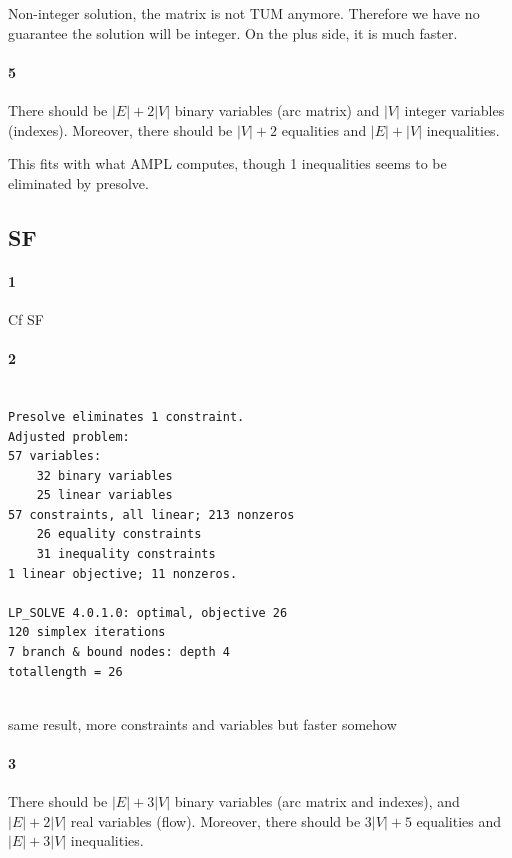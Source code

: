 \documentclass{article}
\begin{document}
Non-integer solution, the matrix is not TUM anymore. Therefore we have no guarantee the solution will be integer.
On the plus side, it is much faster.

\paragraph{5}

There should be $|E|+2|V|$ binary variables (arc matrix) and $|V|$ integer variables (indexes). Moreover, there should be $|V|+2$ equalities and $|E|+|V|$ inequalities.

This fits with what AMPL computes, though 1 inequalities seems to be eliminated by presolve.

\subsection{SF}

\paragraph{1}

Cf SF

\paragraph{2}

\begin{lstlisting}

Presolve eliminates 1 constraint.
Adjusted problem:
57 variables:
	32 binary variables
	25 linear variables
57 constraints, all linear; 213 nonzeros
	26 equality constraints
	31 inequality constraints
1 linear objective; 11 nonzeros.

LP_SOLVE 4.0.1.0: optimal, objective 26
120 simplex iterations
7 branch & bound nodes: depth 4
totallength = 26
  
\end{lstlisting}

same result, more constraints and variables but faster somehow

\paragraph{3}

There should be $|E|+3|V|$ binary variables (arc matrix and indexes), and $|E|+2|V|$ real variables (flow). Moreover, there should be $3|V|+5$ equalities and $|E|+3|V|$ inequalities.
\end{document}
